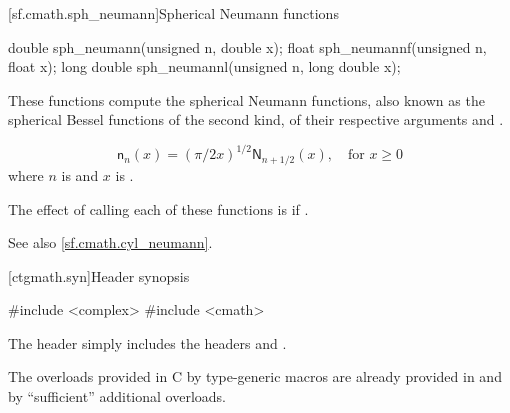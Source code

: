 [sf.cmath.sph_neumann]{Spherical Neumann functions}%
%
%
%
%
%
%
\begin{itemdecl}
double       sph_neumann(unsigned n, double x);
float        sph_neumannf(unsigned n, float x);
long double  sph_neumannl(unsigned n, long double x);
\end{itemdecl}

\begin{itemdescr}

\pnum\effects
These functions compute the spherical Neumann functions,
also known as the spherical Bessel functions of the second kind,
of their respective arguments
 and .

\pnum\returns
\[%
  \mathsf{n}_n(x) =
  (\pi/2x)^{1\!/\!2} \mathsf{N}_{n + 1\!/\!2}(x),
	   \quad \mbox{for $x \ge 0$}
\]
where
$n$ is  and
$x$ is .

\pnum\remarks
The effect of calling each of these functions
is 
if .

\pnum See also \ref{sf.cmath.cyl_neumann}.
\end{itemdescr}


[ctgmath.syn]{Header  synopsis}

%
%
\begin{codeblock}
#include <complex>
#include <cmath>
\end{codeblock}

\pnum
The header  simply includes the headers 
and .

\pnum
\begin{note} The overloads provided in C by type-generic macros are already
provided in  and  by ``sufficient'' additional
overloads.\end{note}
